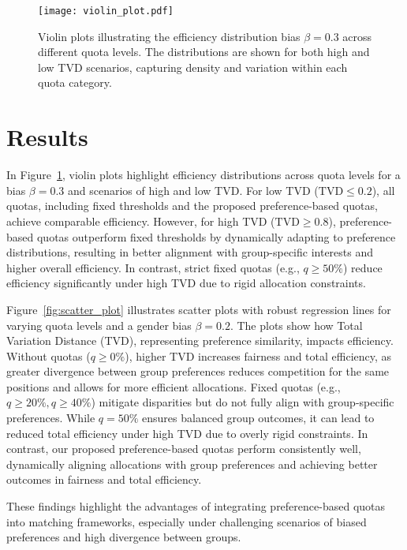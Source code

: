 \documentclass[letterpaper]{article}
\begin{document}
\begin{figure}[ht]

  \centering
  \texttt{[image: violin\_plot.pdf]}
\caption{Violin plots illustrating the efficiency distribution bias \( \beta = 0.3 \) across different quota levels. The distributions are shown for both high and low TVD scenarios, capturing density and variation within each quota category.}

  \label{fig:violin_plot}
\end{figure}

\section{Results}

In Figure~\ref{fig:violin_plot}, violin plots highlight efficiency distributions across quota levels for a bias \( \beta = 0.3 \) and scenarios of high and low TVD. For low TVD (\( \text{TVD} \leq 0.2 \)), all quotas, including fixed thresholds and the proposed preference-based quotas, achieve comparable efficiency. However, for high TVD (\( \text{TVD} \geq 0.8 \)), preference-based quotas outperform fixed thresholds by dynamically adapting to preference distributions, resulting in better alignment with group-specific interests and higher overall efficiency. In contrast, strict fixed quotas (e.g., \( q \geq 50\% \)) reduce efficiency significantly under high TVD due to rigid allocation constraints.

Figure~\ref{fig:scatter_plot} illustrates scatter plots with robust regression lines for varying quota levels and a gender bias \( \beta = 0.2 \). The plots show how Total Variation Distance (TVD), representing preference similarity, impacts efficiency. Without quotas (\( q \geq 0\% \)), higher TVD increases fairness and total efficiency, as greater divergence between group preferences reduces competition for the same positions and allows for more efficient allocations. Fixed quotas (e.g., \( q \geq 20\%, q \geq 40\% \)) mitigate disparities but do not fully align with group-specific preferences. While \( q = 50\% \) ensures balanced group outcomes, it can lead to reduced total efficiency under high TVD due to overly rigid constraints. In contrast, our proposed preference-based quotas perform consistently well, dynamically aligning allocations with group preferences and achieving better outcomes in fairness and total efficiency.


These findings highlight the advantages of integrating preference-based quotas into matching frameworks, especially under challenging scenarios of biased preferences and high divergence between groups.
\end{document}

